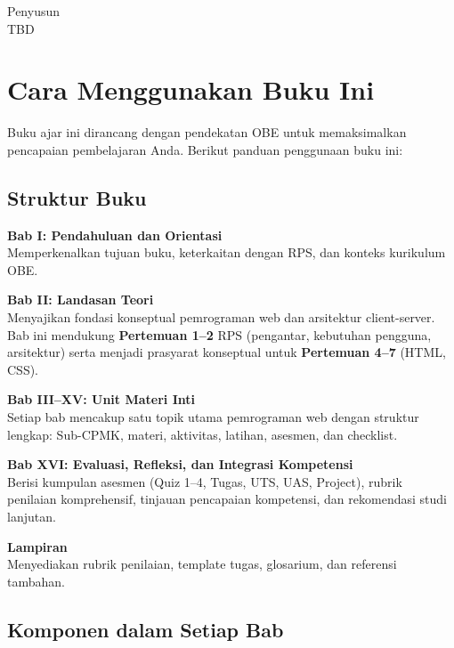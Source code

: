 \vspace{1cm}
\begin{flushright}
Penyusun\\
TBD
\end{flushright}

\cleardoublepage

\chapter*{Cara Menggunakan Buku Ini}

Buku ajar ini dirancang dengan pendekatan OBE untuk memaksimalkan pencapaian pembelajaran Anda. Berikut panduan penggunaan buku ini:

\section*{Struktur Buku}

\textbf{Bab I: Pendahuluan dan Orientasi}\\
Memperkenalkan tujuan buku, keterkaitan dengan RPS, dan konteks kurikulum OBE.

\textbf{Bab II: Landasan Teori}\\
Menyajikan fondasi konseptual pemrograman web dan arsitektur client-server. Bab ini mendukung \textbf{Pertemuan 1--2} RPS (pengantar, kebutuhan pengguna, arsitektur) serta menjadi prasyarat konseptual untuk \textbf{Pertemuan 4--7} (HTML, CSS).

\textbf{Bab III–XV: Unit Materi Inti}\\
Setiap bab mencakup satu topik utama pemrograman web dengan struktur lengkap: Sub-CPMK, materi, aktivitas, latihan, asesmen, dan checklist.

\textbf{Bab XVI: Evaluasi, Refleksi, dan Integrasi Kompetensi}\\
Berisi kumpulan asesmen (Quiz 1--4, Tugas, UTS, UAS, Project), rubrik penilaian komprehensif, tinjauan pencapaian kompetensi, dan rekomendasi studi lanjutan.

\textbf{Lampiran}\\
Menyediakan rubrik penilaian, template tugas, glosarium, dan referensi tambahan.

\section*{Komponen dalam Setiap Bab}

